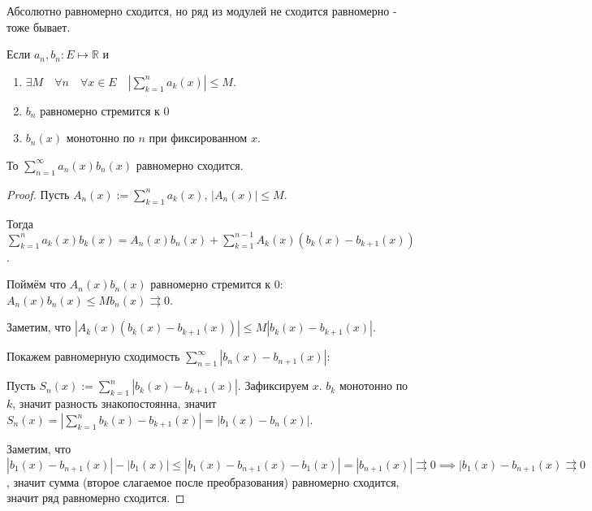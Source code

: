 \begin{example} \thmslashn

    Абсолютно равномерно сходится, но ряд из модулей не сходится равномерно - тоже бывает.
\end{example}
\begin{theorem} \thmslashn

    Если $a_{n}, b_{n} : E \mapsto \mathbb{R}$ и
    \begin{enumerate}
        \item $\exists{M}\quad \forall{n}\quad  \forall{x\in E}\quad |\sum\limits_{k=1}^{n} a_{k}(x)| \le M$.
        \item $b_{n}$ равномерно стремится к $0$
        \item $b_{n}(x)$ монотонно по $n$ при фиксированном $x$.
    \end{enumerate}
    То $\sum\limits_{n=1}^{\infty} a_{n}(x)b_{n}(x)$ равномерно сходится.
    \begin{proof} \thmslashn
    
        Пусть $A_{n}(x) := \sum\limits_{k=1}^{n} a_{k}(x)$, $|A_{n}(x)| \le M$.

        Тогда $\sum\limits_{k=1}^{n} a_{k}(x)b_{k}(x) = A_{n}(x)b_{n}(x) + \sum\limits_{k=1}^{n-1} A_{k}(x)(b_{k}(x)-b_{k+1}(x))$.

        Поймём что $A_{n}(x)b_{n}(x)$ равномерно стремится к $0$: $A_{n}(x)b_{n}(x) \le Mb_{n}(x) \rightrightarrows 0$.

        Заметим, что $|A_{k}(x)(b_{k}(x)-b_{k+1}(x))| \le M|b_{k}(x) - b_{k+1}(x)|$.

        Покажем равномерную сходимость $\sum\limits_{n=1}^{\infty} |b_{n}(x) - b_{n+1}(x)|$:

        Пусть $S_{n}(x) := \sum\limits_{k=1}^{n} |b_{k}(x) - b_{k+1}(x)|$. Зафиксируем $x$. $b_{k}$ монотонно по $k$, значит разность знакопостоянна, значит  $S_{n}(x) = \left| \sum\limits_{k=1}^{n} b_{k}(x) - b_{k+1}(x)\right| = \left|b_{1}(x) - b_{n}(x)\right|$.

        Заметим, что $|b_1(x)-b_{n+1}(x)| - |b_1(x)| \le |b_1(x)-b_{n+1}(x)-b_1(x)| = |b_{n+1}(x)| \rightrightarrows 0 \implies |b_{1}(x) - b_{n+1}(x) \rightrightarrows 0$, значит сумма (второе слагаемое после преобразования) равномерно сходится, значит ряд равномерно сходится.
    \end{proof}
\end{theorem}
